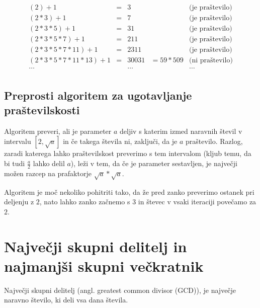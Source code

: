 \documentclass[10pt,a4paper,oneside]{book}
\begin{document}
\[\begin{array}{ccccc}
(2)+1 &=& 3& &\mbox{(je praštevilo)}\\
(2*3)+1 &=& 7& &\mbox{(je praštevilo)}\\
(2*3*5)+1 &=& 31& &\mbox{(je praštevilo)}\\
(2*3*5*7)+1 &=& 211& &\mbox{(je praštevilo)}\\
(2*3*5*7*11)+1 &=& 2311& &\mbox{(je praštevilo)}\\
(2*3*5*7*11*13)+1 &=& 30031 &= 59*509 &\mbox{(ni praštevilo)}\\
\dots & & \dots& & \dots \\
\end{array}\]
\subsection{Preprosti algoritem za ugotavljanje praštevilskosti} 
Algoritem preveri, ali je parameter $a$ deljiv s katerim izmed naravnih števil v intervalu $\left[2, \sqrt{a}\right]$ in če takega števila ni, zaključi, da je $a$ praštevilo. Razlog, zaradi katerega lahko praštevilskost preverimo s tem intervalom (kljub temu, da bi tudi $\frac{a}{2}$ lahko delil $a$), leži v tem, da če je parameter sestavljen, je največji možen razcep na prafaktorje $\sqrt{a}*\sqrt{a}$.

Algoritem je moč nekoliko pohitriti tako, da že pred zanko preverimo ostanek pri deljenju z $2$, nato lahko zanko začnemo s $3$ in števec v vsaki iteraciji povečamo za $2$.\\


\section{Največji skupni delitelj in najmanjši skupni večkratnik}
Največji skupni delitelj (angl. greatest common divisor (GCD)), je največje naravno število, ki deli vsa dana števila.
\end{document}
